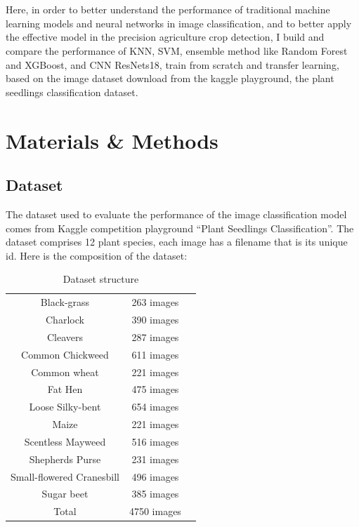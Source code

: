 \documentclass[11pt]{article}
\begin{document}
\\
\\
Here, in order to better understand the performance of traditional machine learning models and neural networks in image classification, and to better apply the effective model in the precision agriculture crop detection, I build and compare the performance of KNN, SVM, ensemble method like Random Forest and XGBoost, and CNN ResNets18, train from scratch and transfer learning, based on the image dataset download from the kaggle playground, the plant seedlings classification dataset. 

\section{Materials \& Methods}
\subsection{Dataset}
The dataset used to evaluate the performance of the image classification model comes from Kaggle competition playground ``Plant Seedlings Classification''. The dataset comprises 12 plant species, each image has a filename that is its unique id. Here is the composition of the dataset:

\begin{table}[h]
\centering
\begin{tabular}{ccc}
\hline
Black-grass&263 images\\
Charlock&390 images\\
Cleavers&287 images\\
Common Chickweed&611 images\\
Common wheat&221 images\\
Fat Hen&475 images\\
Loose Silky-bent&654 images\\
Maize&221 images\\
Scentless Mayweed&516 images\\
Shepherds Purse&231 images\\
Small-flowered Cranesbill&496 images\\
Sugar beet&385 images\\
\hline
Total&4750 images\\
\hline
\end{tabular}
\caption{Dataset structure}
\end{table}
\end{document}

